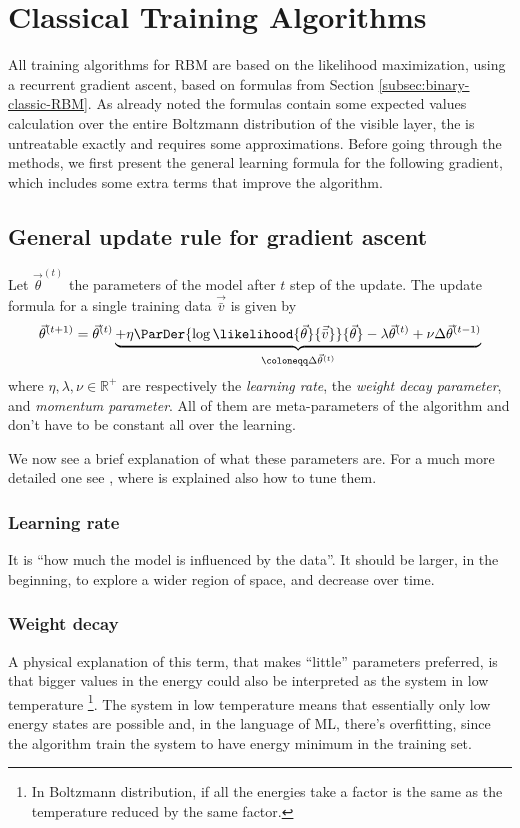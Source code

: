 \section{Classical Training Algorithms}
  All training algorithms for RBM are based on the likelihood maximization,
  using a recurrent gradient ascent, based on formulas from Section \ref{subsec:binary-classic-RBM}.
  As already noted the formulas contain some expected values calculation over the
  entire Boltzmann distribution of the visible layer, the is untreatable exactly
  and requires some approximations.
  Before going through the methods, we first present the general learning formula for 
  the following gradient, which includes some extra terms that improve the algorithm.
  
  \subsection{General update rule for gradient ascent} \label{subsec:general-gradient-rules}
  Let \(\vec{\theta}^{(t)}\) the parameters of the model after \(t\) step of the update.
  The update formula for a single training data \(\vec{\bar{v}}\) is given by
  \[
    \vec{\theta}^{(t+1)} = \vec{\theta}^{(t)}
                           \underbrace{
                             + \eta \ParDer{\log\likelihood{\vec{\theta}}{\vec{\bar{v}}}}{\vec{\theta}}
                             - \lambda \vec{\theta}^{(t)}
                             + \nu \Delta\vec{\theta}^{(t-1)}
                           }_{\coloneqq \Delta\vec{\theta}^{(t)}}
  \]
  where \(\eta,\lambda,\nu \in \mathbb{R}^+\) are respectively the \emph{learning rate},
  the \emph{weight decay parameter}, and \emph{momentum parameter}.
  All of them are meta-parameters of the algorithm and don't have to be constant all
  over the learning.
  
  We now see a brief explanation of what these parameters are. For a much more detailed one
  see \cite{hinton2012practical}, where is explained  also how to tune them.
  \subsubsection{Learning rate}
  It is ``how much the model is influenced by the data''. It should be larger, in the beginning, to
  explore a wider region of space, and decrease over time.
  \subsubsection{Weight decay}
  A physical explanation of this term, that makes ``little'' parameters preferred, is that
  bigger values in the energy could also be interpreted as the system in low temperature
  \footnote{In Boltzmann distribution, if all the energies take a factor is the same as
  the temperature reduced by the same factor.}. The system in low temperature means that
  essentially only low energy states are possible and, in the language of ML, there's overfitting,
  since the algorithm train the system to have energy minimum in the training set.
  
